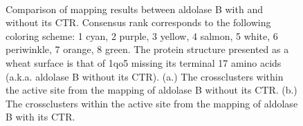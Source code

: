\documentclass[11pt,a4paper]{article}
\begin{document}
\begin{figure}
        \begin{center}
                \mbox
                {
                        \quad
                }
                \caption{Comparison of mapping results between aldolase B with and without its CTR.
                        Consensus rank corresponds to the following coloring scheme:  1 cyan, 2 purple, 3 yellow,
                        4 salmon, 5 white, 6 periwinkle, 7 orange, 8 green.  The protein structure presented as
			a wheat surface is that of 1qo5 missing its terminal 17 amino acids (a.k.a. aldolase B without its CTR).
                        (a.)  The crossclusters within the active site from the mapping of aldolase B without its CTR.
                        (b.)  The crossclusters within the active site from the mapping of aldolase B with its CTR.
                }
                \label{B_comparison}
        \end{center}
\end{figure}
\end{document}

